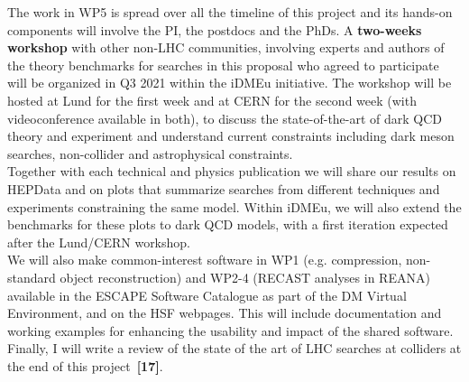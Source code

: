 The work in WP5 is spread over all the timeline of this project and its hands-on components will involve the PI, the postdocs and the PhDs.
A \textbf{two-weeks workshop} with other non-LHC communities, involving experts and authors of the theory benchmarks for searches in this proposal who agreed to participate~\cite{ToBeCited} %
will be organized in Q3 2021 within the iDMEu initiative. 
The workshop will be hosted at Lund for the first week and at CERN for the second week (with videoconference available in both), to discuss the state-of-the-art of dark QCD theory and experiment and understand current constraints including dark meson searches, non-collider and astrophysical constraints. \\
Together with each technical and physics publication we will share our results on HEPData and on plots that summarize searches from different techniques and experiments constraining the same model. Within iDMEu, we will also extend the benchmarks for these plots to dark QCD models, with a first iteration expected after the Lund/CERN workshop. \\
We will also make common-interest software in WP1 (e.g. compression, non-standard object reconstruction) and WP2-4 (RECAST analyses in REANA) available in the ESCAPE Software Catalogue as part of the DM Virtual Environment, and on the HSF webpages. 
This will include documentation and working examples for enhancing the usability and impact of the shared software. \\
Finally, I will write a review of the state of the art of LHC searches at colliders at the end of this project~\textbf{[17]}. 




